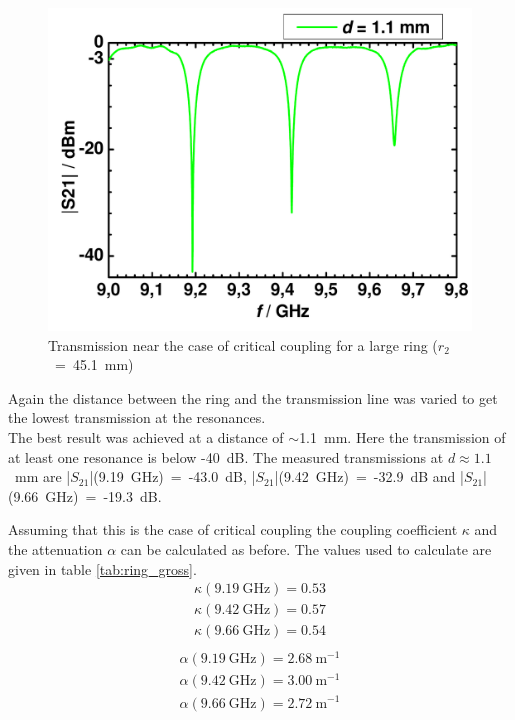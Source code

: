 \begin{figure}%
\centering
\includegraphics[width=.6\columnwidth]{Grafiken/05_11.pdf}%
\caption{Transmission near the case of critical coupling for a large ring ($r_2$~=~45.1~mm)}%
\label{fig:05_11}%
\end{figure}
Again the distance between the ring and the transmission line was varied to get the lowest transmission at the resonances. \\The best result was achieved at a distance of $\sim$1.1~mm. Here the transmission of at least one resonance is below \mbox{-40~dB}.
The measured transmissions at $d \approx 1.1$~mm are |$S_{21}$|(9.19~GHz)~=~\mbox{-43.0~dB}, |$S_{21}$|(9.42~GHz)~=~\mbox{-32.9~dB} and |$S_{21}$|(9.66~GHz)~=~-19.3~dB.

Assuming that this is the case of critical coupling the coupling coefficient $\kappa$ and the attenuation $\alpha$ can be calculated as before. The values used to calculate are given in table \ref{tab:ring_gross}.
\begin{equation}
\begin{split}
\kappa(9.19~\mathrm{GHz})=0.53\\
\kappa(9.42~\mathrm{GHz})=0.57\\
\kappa(9.66~\mathrm{GHz})=0.54\\
\end{split}
\label{eq:}
\end{equation}
\begin{equation}
\begin{split}
\alpha(9.19~\mathrm{GHz})=2.68~\mathrm{m}^{-1}\\
\alpha(9.42~\mathrm{GHz})=3.00~\mathrm{m}^{-1}\\
\alpha(9.66~\mathrm{GHz})=2.72~\mathrm{m}^{-1}
\end{split}
\label{eq:}
\end{equation}

